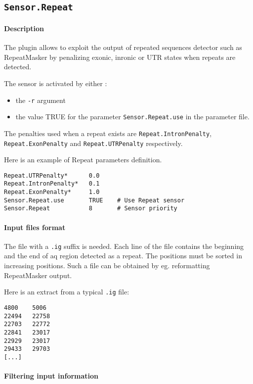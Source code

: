 
\subsection{\texttt{Sensor.Repeat}}

\paragraph{Description}

The plugin allows to exploit the output of repeated sequences detector
such as RepeatMasker by penalizing exonic, inronic or UTR states when
repeats are detected.

The sensor is activated by either :
\begin{itemize}
\item the \texttt{-r} argument 
\item the value TRUE for the parameter \texttt{Sensor.Repeat.use} in the
  parameter file.
\end{itemize}
The penalties used when a repeat exists are \texttt{Repeat.IntronPenalty},
\texttt{Repeat.ExonPenalty} and \texttt{Repeat.UTRPenalty}
respectively.

Here is an example of Repeat parameters definition.
\begin{Verbatim}[fontsize=\small]
Repeat.UTRPenalty*      0.0
Repeat.IntronPenalty*   0.1
Repeat.ExonPenalty*     1.0
Sensor.Repeat.use       TRUE    # Use Repeat sensor
Sensor.Repeat           8       # Sensor priority
\end{Verbatim}

\paragraph{Input files format}

The file with a \texttt{.ig} suffix is needed. Each line of the file
contains the beginning and the end of aq region detected as a
repeat. The positions must be sorted in increasing positions. Such a
file can be obtained by eg. reformatting RepeatMasker output.

Here is an extract from a typical \texttt{.ig} file:
\begin{Verbatim}[fontsize=\small]
4800    5006
22494   22758
22703   22772
22841   23017
22929   23017
29433   29703
[...]
\end{Verbatim}

\paragraph{Filtering input information}

